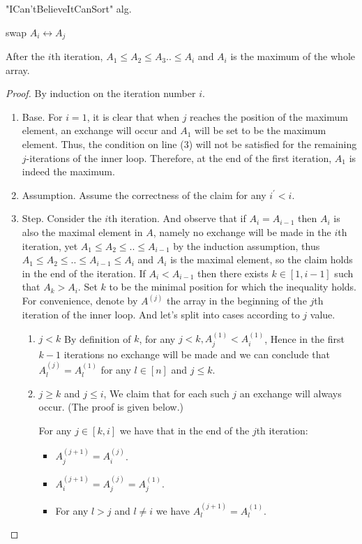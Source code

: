 \documentclass[manuscript,screen,review]{acmart}
\begin{document}
\begin{algorithm}
\SetAlgoLined
{}
\caption{ "ICan'tBelieveItCanSort"  alg.}
 {
   {
     {
      swap $A_{i} \leftrightarrow A_{j}$
    }
  }
}
\end{algorithm}
\begin{claim}
  \label{claim:first}
  After the $i$th iteration, $A_{1} \le A_{2} \le A_{3} .. \le A_{i}$ and $A_{i}$ is the maximum of the whole array. 
\end{claim}
\begin{proof}
  By induction on the iteration number $i$. 
  \begin{enumerate}
    \item Base. For $i=1$, it is clear that when $j$ reaches the position of the maximum element, an exchange will occur and $A_{1}$ will be set to be the maximum element. Thus, the condition on line (3) will not be satisfied for the remaining $j$-iterations of the inner loop. Therefore, at the end of the first iteration, $A_{1}$ is indeed the maximum.
    \item Assumption. Assume the correctness of the claim for any $i^{\prime} < i$. 
    \item Step. Consider the $i$th iteration. And observe that if $A_{i} = A_{i-1}$ then $A_{i}$ is also the maximal element in $A$, namely no exchange will be made in the $i$th iteration, yet $A_{1} \le A_{2} \le .. \le A_{i-1}$ by the induction assumption, thus  $A_{1} \le A_{2} \le .. \le A_{i-1} \le A_{i}$ and $A_{i}$ is the maximal element, so the claim holds in the end of the iteration. 
      If $A_{i} < A_{i-1}$ then there exists $k \in [1,i-1]$ such that $A_{k} > A_{i}$. Set $k$ to be the minimal position for which the inequality holds. For convenience, denote by $A^{(j)}$ the array in the beginning of the $j$th iteration of the inner loop. And let's split into cases according to $j$ value. 
      \begin{enumerate}
        \item $j < k$ By definition of $k$, for any $j < k, A^{(1)}_{j} < A^{(1)}_{i}$, Hence in the first $k-1$ iterations no exchange will be made and we can conclude that $A^{(j)}_{l} = A^{(1)}_{l}$ for any $l \in [n]$ and $j \le k$. 
        \item $j \ge k$ and $j\le i$, We claim that for each such $j$ an exchange will always occur. (The proof is given below.)
          \begin{claim}
            \label{claim:second}
            For any $j \in [k,i]$ we have that in the end of the $j$th iteration:  
            \begin{itemize}
              \item $A^{(j+1)}_{j} = A^{(j)}_{i}$.
              \item $A^{(j+1)}_{i} = A^{(j)}_{j} = A^{(1)}_{j}$.
              \item For any $l > j$ and $l \neq i$ we have $A^{(j+1)}_{l} = A^{(1)}_{l}$.
            \end{itemize}
          \end{claim}


\end{enumerate}
\end{enumerate}
\end{proof}
\end{document}
